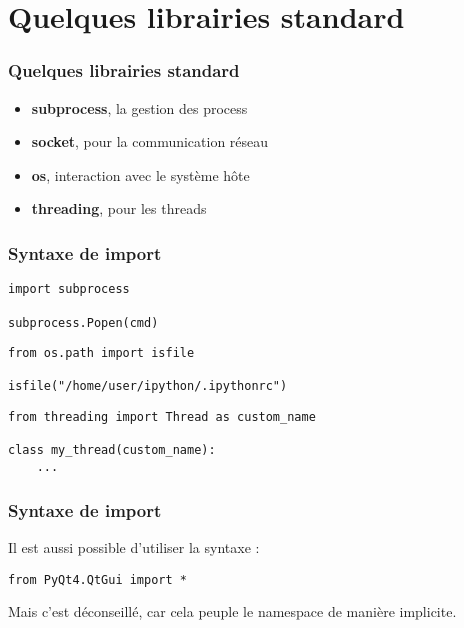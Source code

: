 \section{Quelques librairies standard}
\begin{frame}[fragile]
  \frametitle{Quelques librairies standard}
  \begin{itemize}
    \item<1-> {\bf subprocess}, la gestion des process
    \item<2-> {\bf socket}, pour la communication réseau
    \item<3-> {\bf os}, interaction avec le système hôte
    \item<4-> {\bf threading}, pour les threads
  \end{itemize}
\end{frame}

\begin{frame}[fragile]
  \frametitle{Syntaxe de import}
  \begin{lstlisting}
import subprocess

subprocess.Popen(cmd)
  \end{lstlisting}

  \begin{lstlisting}
from os.path import isfile

isfile("/home/user/ipython/.ipythonrc")
  \end{lstlisting}

  \begin{lstlisting}
from threading import Thread as custom_name

class my_thread(custom_name):
    ...
  \end{lstlisting}
\end{frame}

\begin{frame}[fragile]
  \frametitle{Syntaxe de import}
Il est aussi possible d'utiliser la syntaxe :
  \begin{lstlisting}
from PyQt4.QtGui import *
  \end{lstlisting}
Mais c'est déconseillé, car cela peuple le namespace de manière implicite.
\end{frame}
\newpage

